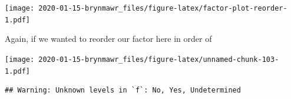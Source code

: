 \documentclass[]{book}
\newenvironment{Shaded}{\begin{snugshade}}{\end{snugshade}}
\newcommand{\KeywordTok}[1]{\textcolor[rgb]{0.13,0.29,0.53}{\textbf{#1}}}
\newcommand{\DataTypeTok}[1]{\textcolor[rgb]{0.13,0.29,0.53}{#1}}
\newcommand{\StringTok}[1]{\textcolor[rgb]{0.31,0.60,0.02}{#1}}
\newcommand{\OtherTok}[1]{\textcolor[rgb]{0.56,0.35,0.01}{#1}}
\newcommand{\OperatorTok}[1]{\textcolor[rgb]{0.81,0.36,0.00}{\textbf{#1}}}
\newcommand{\NormalTok}[1]{#1}
\begin{document}
\texttt{[image: 2020-01-15-brynmawr\_files/figure-latex/factor-plot-reorder-1.pdf]}

Again, if we wanted to reorder our factor here in order of

\begin{Shaded}
\end{Shaded}

\texttt{[image: 2020-01-15-brynmawr\_files/figure-latex/unnamed-chunk-103-1.pdf]}

\begin{Shaded}
\end{Shaded}

\begin{verbatim}
## Warning: Unknown levels in `f`: No, Yes, Undetermined
\end{verbatim}
\end{document}

